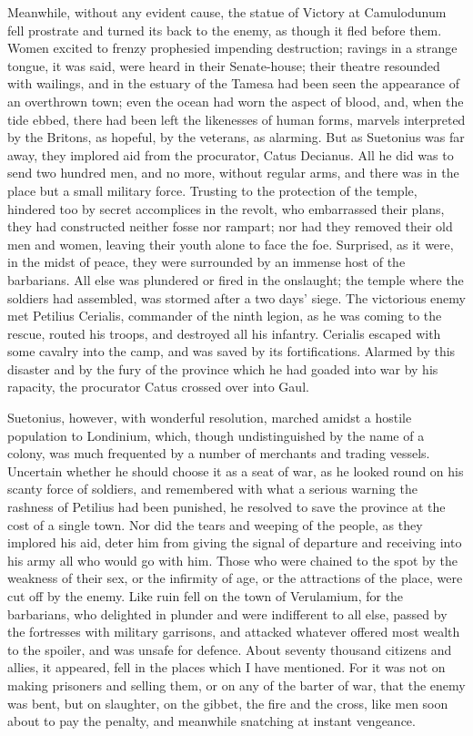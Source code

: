 Meanwhile, without any evident cause, the statue of Victory at Camulodunum fell prostrate and turned its back to the enemy, as though it fled before them. Women excited to frenzy prophesied impending destruction; ravings in a strange tongue, it was said, were heard in their Senate-house; their theatre resounded with wailings, and in the estuary of the Tamesa had been seen the appearance of an overthrown town; even the ocean had worn the aspect of blood, and, when the tide ebbed, there had been left the likenesses of human forms, marvels interpreted by the Britons, as hopeful, by the veterans, as alarming. But as Suetonius was far away, they implored aid from the procurator, Catus Decianus. All he did was to send two hundred men, and no more, without regular arms, and there was in the place but a small military force. Trusting to the protection of the temple, hindered too by secret accomplices in the revolt, who embarrassed their plans, they had constructed neither fosse nor rampart; nor had they removed their old men and women, leaving their youth alone to face the foe. Surprised, as it were, in the midst of peace, they were surrounded by an immense host of the barbarians. All else was plundered or fired in the onslaught; the temple where the soldiers had assembled, was stormed after a two days' siege. The victorious enemy met Petilius Cerialis, commander of the ninth legion, as he was coming to the rescue, routed his troops, and destroyed all his infantry. Cerialis escaped with some cavalry into the camp, and was saved by its fortifications. Alarmed by this disaster and by the fury of the province which he had goaded into war by his rapacity, the procurator Catus crossed over into Gaul.


Suetonius, however, with wonderful resolution, marched amidst a hostile population to Londinium, which, though undistinguished by the name of a colony, was much frequented by a number of merchants and trading vessels. Uncertain whether he should choose it as a seat of war, as he looked round on his scanty force of soldiers, and remembered with what a serious warning the rashness of Petilius had been punished, he resolved to save the province at the cost of a single town. Nor did the tears and weeping of the people, as they implored his aid, deter him from giving the signal of departure and receiving into his army all who would go with him. Those who were chained to the spot by the weakness of their sex, or the infirmity of age, or the attractions of the place, were cut off by the enemy. Like ruin fell on the town of Verulamium, for the barbarians, who delighted in plunder and were indifferent to all else, passed by the fortresses with military garrisons, and attacked whatever offered most wealth to the spoiler, and was unsafe for defence. About seventy thousand citizens and allies, it appeared, fell in the places which I have mentioned. For it was not on making prisoners and selling them, or on any of the barter of war, that the enemy was bent, but on slaughter, on the gibbet, the fire and the cross, like men soon about to pay the penalty, and meanwhile snatching at instant vengeance.

